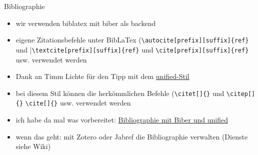 \begin{frame}[fragile]{Bibliographie}
    \begin{itemize}[<+->]
        \item wir verwenden biblatex mit biber als backend
        \item eigene Zitationsbefehle unter BibLaTex (\lstinline|\autocite[prefix][suffix]{ref}| und |\lstinline|\textcite[prefix][suffix]{ref}| und \lstinline|\cite[prefix][suffix]{ref}| usw. verwendet werden
        \item Dank an Timm Lichte für den Tipp mit dem \href{http://celxj.org/downloads/USS-NoComments.pdf}{unified-Stil}
        \item bei diesem Stil können die herkömmlichen Befehle (\lstinline|\citet[]{}| und \lstinline|\citep[]{}| \lstinline|\cite[]{}| usw. verwendet werden
        \item ich habe da mal was vorbereitet: \href{https://github.com/inktrap/LaTeXKurs/tree/master/4/tex/biber/}{Bibliographie mit Biber und unified}
        \item wenn das geht: mit Zotero oder Jabref die Bibliographie verwalten (Dienste siehe Wiki)
    \end{itemize}
\end{frame}

